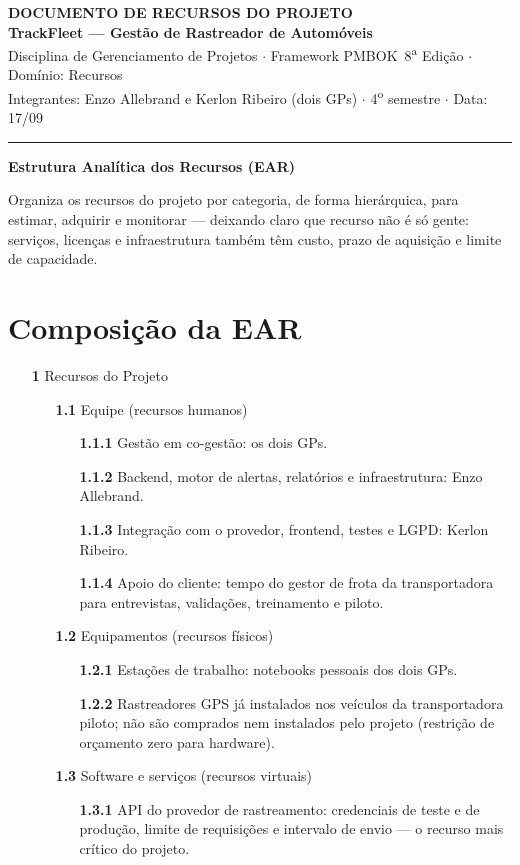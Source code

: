 \documentclass[11pt,a4paper]{article}
\newcommand{\cabecalho}[3]{%
  \begin{center}
  {\Large\bfseries DOCUMENTO DE #1 DO PROJETO}\\[2pt]
  {\large\bfseries TrackFleet --- Gestão de Rastreador de Automóveis}\\[4pt]
  Disciplina de Gerenciamento de Projetos $\cdot$ Framework PMBOK\textregistered\ 8\textsuperscript{a} Edição $\cdot$ Domínio: #2\\[2pt]
  Integrantes: Enzo Allebrand e Kerlon Ribeiro (dois GPs) $\cdot$ 4\textsuperscript{o} semestre $\cdot$ Data: #3
  \end{center}
  \vspace{2mm}\hrule\vspace{4mm}}
\newcommand{\parte}[1]{\noindent\textbf{\large #1}\par\vspace{1mm}}
\begin{document}
\cabecalho{RECURSOS}{Recursos}{17/09}

\parte{Estrutura Analítica dos Recursos (EAR)}
\noindent Organiza os recursos do projeto por categoria, de forma hierárquica, para estimar, adquirir e monitorar --- deixando claro que recurso não é só gente: serviços, licenças e infraestrutura também têm custo, prazo de aquisição e limite de capacidade.

\section{Composição da EAR}

\begin{itemize}[itemsep=4pt]
  \item[\textbf{1}] Recursos do Projeto
  \begin{itemize}[itemsep=3pt]
    \item[\textbf{1.1}] Equipe (recursos humanos)
    \begin{itemize}[itemsep=1pt]
      \item[\textbf{1.1.1}] Gestão em co-gestão: os dois GPs.
      \item[\textbf{1.1.2}] Backend, motor de alertas, relatórios e infraestrutura: Enzo Allebrand.
      \item[\textbf{1.1.3}] Integração com o provedor, frontend, testes e LGPD: Kerlon Ribeiro.
      \item[\textbf{1.1.4}] Apoio do cliente: tempo do gestor de frota da transportadora para entrevistas, validações, treinamento e piloto.
    \end{itemize}
    \item[\textbf{1.2}] Equipamentos (recursos físicos)
    \begin{itemize}[itemsep=1pt]
      \item[\textbf{1.2.1}] Estações de trabalho: notebooks pessoais dos dois GPs.
      \item[\textbf{1.2.2}] Rastreadores GPS já instalados nos veículos da transportadora piloto; não são comprados nem instalados pelo projeto (restrição de orçamento zero para hardware).
    \end{itemize}
    \item[\textbf{1.3}] Software e serviços (recursos virtuais)
    \begin{itemize}[itemsep=1pt]
      \item[\textbf{1.3.1}] API do provedor de rastreamento: credenciais de teste e de produção, limite de requisições e intervalo de envio --- o recurso mais crítico do projeto.

\end{itemize}
\end{itemize}
\end{itemize}
\end{document}
